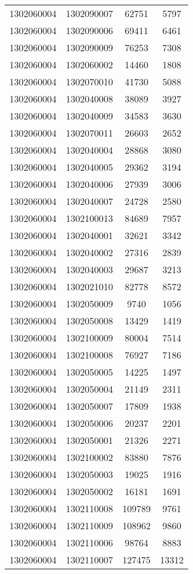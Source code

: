 \begin{longtable}{llcc}
1302060004 & 1302090007 & 62751 & 5797\\
1302060004 & 1302090006 & 69411 & 6461\\
1302060004 & 1302090009 & 76253 & 7308\\
1302060004 & 1302060002 & 14460 & 1808\\
1302060004 & 1302070010 & 41730 & 5088\\
1302060004 & 1302040008 & 38089 & 3927\\
1302060004 & 1302040009 & 34583 & 3630\\
1302060004 & 1302070011 & 26603 & 2652\\
1302060004 & 1302040004 & 28868 & 3080\\
1302060004 & 1302040005 & 29362 & 3194\\
1302060004 & 1302040006 & 27939 & 3006\\
1302060004 & 1302040007 & 24728 & 2580\\
1302060004 & 1302100013 & 84689 & 7957\\
1302060004 & 1302040001 & 32621 & 3342\\
1302060004 & 1302040002 & 27316 & 2839\\
1302060004 & 1302040003 & 29687 & 3213\\
1302060004 & 1302021010 & 82778 & 8572\\
1302060004 & 1302050009 & 9740 & 1056\\
1302060004 & 1302050008 & 13429 & 1419\\
1302060004 & 1302100009 & 80004 & 7514\\
1302060004 & 1302100008 & 76927 & 7186\\
1302060004 & 1302050005 & 14225 & 1497\\
1302060004 & 1302050004 & 21149 & 2311\\
1302060004 & 1302050007 & 17809 & 1938\\
1302060004 & 1302050006 & 20237 & 2201\\
1302060004 & 1302050001 & 21326 & 2271\\
1302060004 & 1302100002 & 83880 & 7876\\
1302060004 & 1302050003 & 19025 & 1916\\
1302060004 & 1302050002 & 16181 & 1691\\
1302060004 & 1302110008 & 109789 & 9761\\
1302060004 & 1302110009 & 108962 & 9860\\
1302060004 & 1302110006 & 98764 & 8883\\
1302060004 & 1302110007 & 127475 & 13312\\

\end{longtable}
